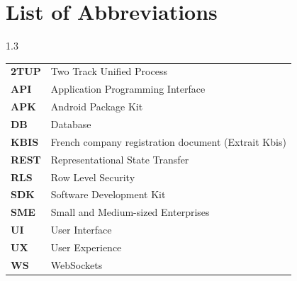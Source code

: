 \chapter*{List of Abbreviations}
\begin{spacing}{1.3}
\begin{tabular}{ll}
    \textbf{2TUP} & Two Track Unified Process \\
    \textbf{API} & Application Programming Interface \\
    \textbf{APK} & Android Package Kit \\
    \textbf{DB} & Database \\
    \textbf{KBIS} & French company registration document (Extrait Kbis) \\
    \textbf{REST} & Representational State Transfer \\
    \textbf{RLS} & Row Level Security \\
    \textbf{SDK} & Software Development Kit \\
    \textbf{SME} & Small and Medium-sized Enterprises \\
    \textbf{UI} & User Interface \\
    \textbf{UX} & User Experience \\
    \textbf{WS} & WebSockets
\end{tabular}
\end{spacing}
